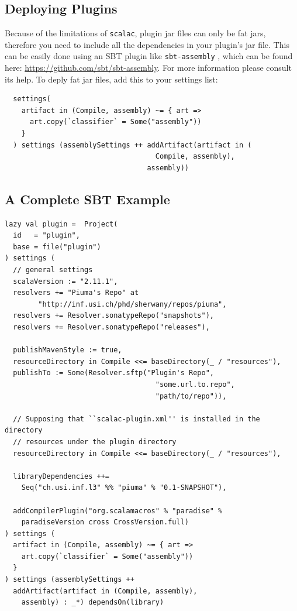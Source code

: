 \documentclass{article}
\renewcommand\c[1]{
  \ifmmode
    \text{#1}
  \else
    \lstinline{#1}
  \fi
}
\begin{document}
\subsection{Deploying Plugins}

Because of the limitations of \texttt{scalac}, plugin jar files can only be fat
jars, therefore you need to include all the dependencies in your plugin's jar
file. This can be easily done using an SBT plugin like \c{sbt-assembly}, which
can be found here: \url{https://github.com/sbt/sbt-assembly}. For more
information please consult its help. To deply fat jar files, add this to your
settings list:

\begin{verbatim}
  settings(
    artifact in (Compile, assembly) ~= { art =>
      art.copy(`classifier` = Some("assembly"))
    }
  ) settings (assemblySettings ++ addArtifact(artifact in (
                                    Compile, assembly),
                                  assembly)) 
\end{verbatim}

\subsection{A Complete SBT Example}

\begin{verbatim}
lazy val plugin =  Project(
  id   = "plugin",
  base = file("plugin")
) settings (
  // general settings
  scalaVersion := "2.11.1",
  resolvers += "Piuma's Repo" at 
        "http://inf.usi.ch/phd/sherwany/repos/piuma",
  resolvers += Resolver.sonatypeRepo("snapshots"),
  resolvers += Resolver.sonatypeRepo("releases"),

  publishMavenStyle := true,
  resourceDirectory in Compile <<= baseDirectory(_ / "resources"),
  publishTo := Some(Resolver.sftp("Plugin's Repo", 
                                    "some.url.to.repo",
                                    "path/to/repo")),

  // Supposing that ``scalac-plugin.xml'' is installed in the directory
  // resources under the plugin directory
  resourceDirectory in Compile <<= baseDirectory(_ / "resources"),

  libraryDependencies ++= 
    Seq("ch.usi.inf.l3" %% "piuma" % "0.1-SNAPSHOT"),

  addCompilerPlugin("org.scalamacros" % "paradise" % 
    paradiseVersion cross CrossVersion.full)
) settings (
  artifact in (Compile, assembly) ~= { art =>
    art.copy(`classifier` = Some("assembly"))
  }
) settings (assemblySettings ++ 
  addArtifact(artifact in (Compile, assembly), 
    assembly) : _*) dependsOn(library)
\end{verbatim}
\end{document}

